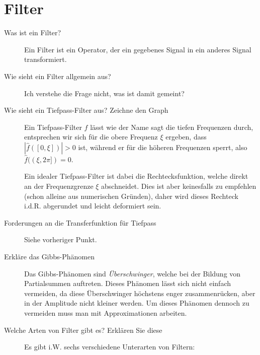 \section{Filter}
\begin{description}
	\item[Was ist ein Filter?]
      Ein Filter ist ein Operator, der ein gegebenes Signal in ein anderes Signal transformiert.
	\item[Wie sieht ein Filter allgemein aus?]
    	Ich verstehe die Frage nicht, was ist damit gemeint?
	\item[Wie sieht ein Tiefpass-Filter aus? Zeichne den Graph]
      Ein Tiefpass-Filter $f$ lässt wie der Name sagt die tiefen Frequenzen durch, entsprechen wir sich für die 
      obere Frequenz $\xi$ ergeben, dass $|\hat f([0,\xi])|>0$ ist, während er für die höheren Frequenzen sperrt, also
      $\hat f((\xi,2\pi]) = 0$.

      Ein idealer Tiefpass-Filter ist dabei die Rechtecksfunktion, welche direkt an der Frequenzgrenze $\xi$
      abschneidet. Dies ist aber keinesfalls zu empfehlen (schon alleine aus numerischen Gründen), daher wird 
      dieses Rechteck i.d.R. abgerundet und leicht deformiert sein.
	\item[Forderungen an die Transferfunktion für Tiefpass]
      Siehe vorheriger Punkt.
	\item[Erkläre das Gibbs-Phänomen]
      Das Gibbs-Phänomen sind \emph{Überschwinger}, welche bei der Bildung von Partialsummen auftreten. Dieses
      Phänomen lässt sich nicht einfach vermeiden, da diese Überschwinger höchstens enger zusammenrücken, aber 
      in der Amplitude nicht kleiner werden. Um dieses Phänomen dennoch zu vermeiden muss man mit Approximationen 
      arbeiten.
	\item[Welche Arten von Filter gibt es? Erklären Sie diese]
      Es gibt i.W. sechs verschiedene Unterarten von Filtern:


\end{description}
